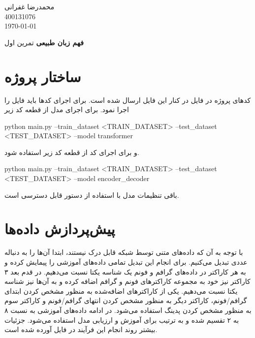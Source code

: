 \documentclass[12pt, a4paper]{book}
\newcommand{\coursetitle}{فهم زبان طبیعی}
\newcommand{\doctitle}{تمرین اول}
\newcommand{\name}{محمدرضا غفرانی}
\newcommand{\studentno}{400131076}
\newcommand{\todaydate}{\today}
\begin{document}
\begin{flushleft}
    \name \\
    \studentno \\
    \todaydate
\end{flushleft}

\begin{center}
    \huge
    \textbf{\coursetitle}
    \break
    \large
    \doctitle
\end{center}

\thispagestyle{plain}

\section*{ساختار پروژه}

کد‌های پروژه در فایل  در کنار این فایل ارسال شده است. برای اجرای کد‌ها باید فایل
 را اجرا نمود. برای اجرای مدل  از قطعه کد زیر

\begin{latin}
    \begin{center}
        python main.py --train\_dataset <TRAIN\_DATASET> --test\_dataset <TEST\_DATASET> --model transformer
    \end{center}
\end{latin}

و برای اجرای کد  از قطعه کد زیر استفاده شود.

\begin{latin}
    \begin{center}
        python main.py --train\_dataset <TRAIN\_DATASET> --test\_dataset <TEST\_DATASET> --model encoder\_decoder
    \end{center}
\end{latin}

باقی تنظیمات مدل با استفاده از دستور  قابل دسترسی است.

\section*{پیش‌پردازش داده‌ها}

با توجه به آن که داده‌های متنی توسط شبکه قابل درک نیستند، ابتدا آن‌ها را به دنباله عددی تبدیل می‌کنیم.
برای انجام این تبدیل تمامی داده‌های آموزشی را پیمایش کرده و به هر کاراکتر در داده‌های گرافم
و فونم یک شناسه یکتا نسبت می‌دهیم. در قدم بعد ۳ کاراکتر نیز خود به مجموعه کاراکتر‌های فونم
و گرافم
اضافه کرده و به آن‌ها نیز شناسه یکتا نسبت می‌دهیم. یکی از کاراکتر‌های اضافه‌شده به منظور مشخص کردن
ابتدای گرافم/فونم، کاراکتر دیگر به منظور مشخص کردن انتهای گرافم/فونم و کاراکتر سوم به منظور مشخص
کردن پدینگ استفاده می‌شود.
در ادامه داده‌های آموزشی به نسبت ۸ به ۲ تقسیم شده و به ترتیب برای آموزش و ارزیابی مدل استفاده می‌شود.
جزئیات بیشتر روند انجام این فرآیند در فایل  آورده شده است.
\end{document}
